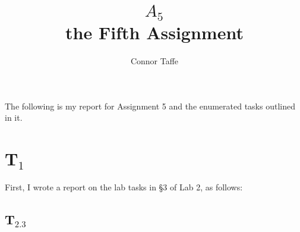 \documentclass[letterpaper, 10pt]{article}
\title{
	$A_{5}$\\
	{\large the Fifth Assignment}
}
\author{Connor Taffe}
\begin{document}
	\maketitle

	The following is my report for Assignment 5 and the enumerated tasks outlined in it.

	\section*{T$_{1}$}

	First, I wrote a report on the lab tasks in \S3 of Lab 2, as follows:

	\subsection*{T$_{2.3}$}
\end{document}
